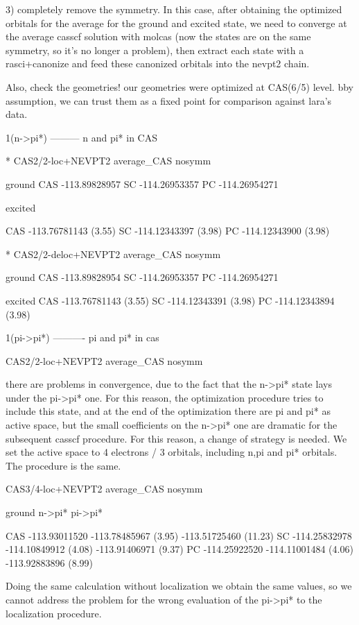 \documentclass[a4paper]{article}
\begin{document}
3) completely remove the symmetry.
In this case, after obtaining the optimized orbitals for the average for the
ground and excited state, we need to converge at the average casscf solution
with molcas (now the states are on the same symmetry, so it's no longer a
problem), then extract each state with a rasci+canonize and feed these
canonized orbitals into the nevpt2 chain.

Also, check the geometries! our geometries were optimized at CAS(6/5) level.
bby assumption, we can trust them as a fixed point for comparison against
lara's data.


1(n->pi*)
---------
n and pi* in CAS

* CAS2/2-loc+NEVPT2 average\_CAS nosymm

ground
CAS -113.89828957
SC  -114.26953357
PC  -114.26954271


excited

CAS -113.76781143 (3.55)
SC  -114.12343397 (3.98)
PC  -114.12343900 (3.98)

* CAS2/2-deloc+NEVPT2 average\_CAS nosymm

ground
CAS  -113.89828954
SC   -114.26953357
PC   -114.26954271

excited
CAS  -113.76781143 (3.55)
SC   -114.12343391 (3.98)
PC   -114.12343894 (3.98)


1(pi->pi*)
----------
pi and pi* in cas

CAS2/2-loc+NEVPT2 average\_CAS nosymm

there are problems in convergence, due to the fact that the n->pi* state lays
under the pi->pi* one. For this reason, the optimization procedure tries to
include this state, and at the end of the optimization there are pi and pi* as
active space, but the small coefficients on the n->pi* one are dramatic for
the subsequent casscf procedure. For this reason, a change of strategy is
needed. We set the active space to 4 electrons / 3 orbitals, including n,pi
and pi* orbitals. The procedure is the same.


CAS3/4-loc+NEVPT2 average\_CAS nosymm

           ground          n->pi*                 pi->pi*

CAS   -113.93011520    -113.78485967 (3.95)   -113.51725460 (11.23)
SC    -114.25832978    -114.10849912 (4.08)   -113.91406971 (9.37)
PC    -114.25922520    -114.11001484 (4.06)   -113.92883896 (8.99)


Doing the same calculation without localization we obtain the same values, so
we cannot address the problem for the wrong evaluation of the pi->pi* to the
localization procedure.
\end{document}
